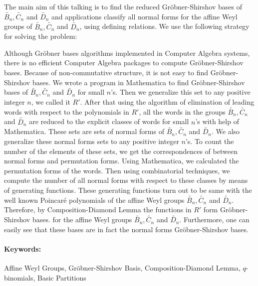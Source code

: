 \documentclass{article}
\newcommand{\KEYWORDS}[1]{\paragraph{Keywords:} #1}
\begin{document}
\par The main aim of this talking is to find the reduced Gr\"{o}bner-Shirshov bases of $\widetilde{B_n}, \widetilde{C_n}$ and $\widetilde{D_n}$ and applications classify all normal forms for the affine Weyl groups of $\widetilde{B_n}, \widetilde{C_n}$ and $\widetilde{D_n}$, using defining relations. We use the following strategy for solving the problem:\\

\par Although Gr\"{o}bner bases algorithms implemented in Computer Algebra systems, there is no efficient Computer Algebra packages to compute Gr\"{o}bner-Shirshov bases. Because of non-commutative structure, it is not easy to find Gr\"{o}bner-Shirshov bases. We wrote a program in Mathematica to find Gr\"{o}bner-Shirshov bases of $\widetilde{B_n}, \widetilde{C_n}$ and $\widetilde{D_n}$ for small $n$'s. Then we generalize this set to any positive integer $n$, we called it $R'$. After that using the algorithm of elimination of leading words with respect to the polynomials in $R'$, all the words in the groups $\tilde{B_n}, \tilde{C_n}$ and $\tilde{D_n}$ are reduced to the explicit classes of words for small $n$'s with help of Mathematica. These sets are sets of normal forms of $\widetilde{B_n}, \widetilde{C_n}$ and $\widetilde{D_n}$. We also generalize these normal forms sets to any positive integer $n$'s. To count the number of the elements of these sets, we get the correspondences of between normal forms and permutation forms. Using Mathematica, we calculated the permutation forms of the words. Then using combinatorial techniques, we compute the number of all normal forms with respect to these classes by means of generating functions. These generating functions turn out to be same with the well known Poincar\'{e} polynomials of the affine Weyl groups $\widetilde{B_n}, \widetilde{C_n}$ and $\widetilde{D_n}$. Therefore, by Composition-Diamond Lemma the functions in $R'$ form Gr\"{o}bner-Shirshov bases. for the affine Weyl groups $\widetilde{B_n}, \widetilde{C_n}$ and $\widetilde{D_n}$. Furthermore, one can easily see that these bases are in fact the normal forms Gr\"{o}bner-Shirshov bases.



\KEYWORDS {Affine Weyl Groups, Gr\"{o}bner-Shirshov Basis, Composition-Diamond Lemma, $q$-binomials, Basic Partitions}

\end{document}
